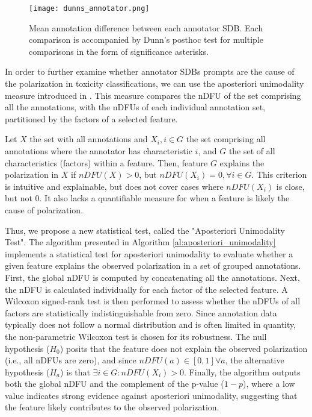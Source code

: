 \begin{figure}
	\centering
	\texttt{[image: dunns\_annotator.png]}
	\caption{Mean annotation difference between each annotator \ac{SDB}. Each comparison is accompanied by Dunn's posthoc test for multiple comparisons in the form of significance asterisks.}
	\label{fig::toxicity-annotator-significance}
\end{figure}

In order to further examine whether annotator \acp{SDB} prompts are the cause of the polarization in toxicity classifications, we can use the aposteriori unimodality measure introduced in \citet{pavlopoulos-likas-2024-polarized}. This measure compares the \ac{nDFU} of the set comprising all the annotations, with the \acp{nDFU} of each individual annotation set, partitioned by the factors of a selected feature. 

Let $X$ the set with all annotations and $X_i, i \in G$ the set comprising all annotations where the annotator has characteristic $i$, and $G$ the set of all characteristics (factors) within a feature. Then, feature $G$ explains the polarization in $X$ if $nDFU(X) > 0$, but $nDFU(X_i) = 0, \forall i \in G$. This criterion is intuitive and explainable, but does not cover cases where $nDFU(X_i)$ is close, but not 0. It also lacks a quantifiable measure for when a feature is likely the cause of polarization. 

Thus, we propose a new statistical test, called the "Aposteriori Unimodality Test". The algorithm presented in Algorithm \ref{al:aposteriori_unimodality} implements a statistical test for aposteriori unimodality to evaluate whether a given feature explains the observed polarization in a set of grouped annotations. First, the global \ac{nDFU} is computed by concatenating all the annotations. Next, the \ac{nDFU} is calculated individually for each factor of the selected feature. A Wilcoxon signed-rank test is then performed to assess whether the \acp{nDFU} of all factors are statistically indistinguishable from zero. Since annotation data typically does not follow a normal distribution and is often limited in quantity, the non-parametric Wilcoxon test is chosen for its robustness. The null hypothesis ($H_0$) posits that the feature does not explain the observed polarization (i.e., all \acp{nDFU} are zero), and since $nDFU(a) \in [0,1] \forall a$, the alternative hypothesis ($H_a$) is that $\exists i \in G: nDFU(X_i) > 0$. Finally, the algorithm outputs both the global \ac{nDFU} and the complement of the p-value ($1 - p$), where a low value indicates strong evidence against aposteriori unimodality, suggesting that the feature likely contributes to the observed polarization.

